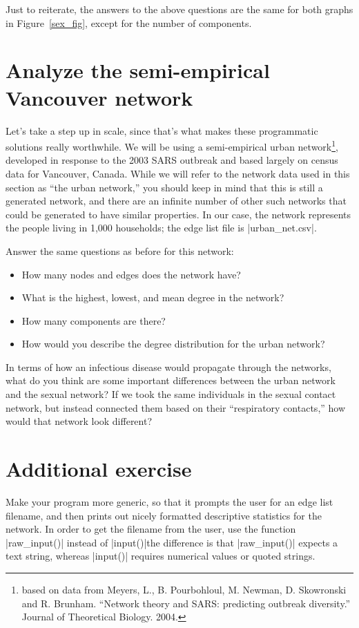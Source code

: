 \documentclass{article}
\begin{document}
Just to reiterate, the answers to the above questions are the same for both graphs in Figure~\ref{sex_fig}, except for the number of components.

\section{Analyze the semi-empirical Vancouver network}
Let's take a step up in scale, since that's what makes these programmatic solutions 
really worthwhile. We will be using a semi-empirical urban network\footnote{based on data from Meyers, L., B. Pourbohloul,
 M. Newman, D. Skowronski and R. Brunham. ``Network theory and SARS: predicting outbreak diversity.'' Journal of Theoretical Biology. 2004.},
developed in response to the 2003 SARS outbreak and based largely on census data for
Vancouver, Canada.  While we will refer to the network data used in this section
as ``the urban network,'' you should keep in mind that this is still a generated
network, and there are an infinite number of other such networks that could be
generated to have similar properties.  In our case, the network represents the
people living in 1,000 households; the edge list file is |urban_net.csv|.

Answer the same questions as before for this network:
\begin{itemize}
 \item How many nodes and edges does the network have?
 \item What is the highest, lowest, and mean degree in the network?
 \item How many components are there?
 \item How would you describe the degree distribution for the urban network?
\end{itemize}

In terms of how an infectious disease would propagate through the networks, what do you think are some important differences between 
the urban network and the sexual network? If we took the same individuals in the sexual contact network, but instead connected them based 
on their ``respiratory contacts,'' how would that network look different?

\section*{Additional exercise}
Make your program more generic, so that it prompts the user for an edge list filename, and then prints out nicely formatted descriptive statistics for
the network.  In order to get the filename from the user, use the function |raw_input()| instead of |input()|\textemdash the difference is that
|raw_input()| expects a text string, whereas |input()| requires numerical values or quoted strings.
\end{document}
